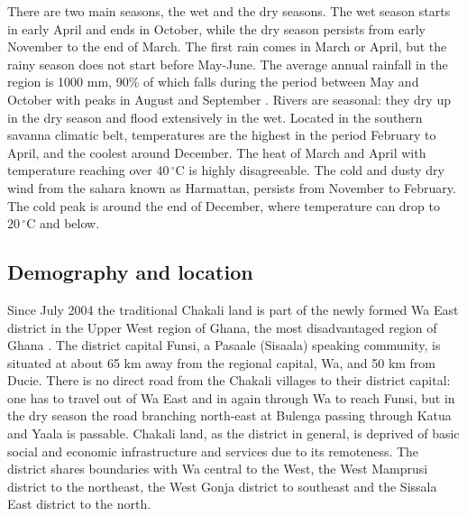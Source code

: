  There are two main seasons, the wet and the dry seasons. The wet season starts
in early April and ends in October, while the dry season persists from early
November to the end  of March. The first rain comes in March or April,
but the rainy season does not start before May-June.  The average annual
rainfall in the region is 1000 mm,  90\% of which falls during the period
between May and October with peaks in August and September \citep[2-3]{Blen05}.
Rivers
are seasonal: they dry up in the dry season and  flood extensively in the wet.
 Located in the  southern savanna climatic belt,   temperatures are the highest in the period February to April, and the
coolest around December. The heat of  March and April with temperature reaching
over $40\,^{\circ}\mathrm{C}$ is highly disagreeable.   The cold and dusty dry
wind from the sahara known as Harmattan,  persists from November to February.
The cold peak is  around the end of December, where temperature can drop to 
$20\,^{\circ}\mathrm{C}$ and below. 



\subsection{Demography and location}
\label{sec:SOC-dem}
Since July 2004 the traditional Chakali land is part of the newly formed Wa East
district in the Upper West region of Ghana, the most disadvantaged region of
Ghana \citep[18]{Blen05}. The district capital Funsi, a Pasaale (Sisaala) 
speaking community, is situated at about 65 km away from the regional capital, Wa, 
and 50 km from Ducie. There is no direct road from
 the Chakali villages to their district capital: one has to travel out of Wa
East and
in again through Wa to reach Funsi,  but in the dry season the road branching
north-east at Bulenga passing through Katua and Yaala is passable. Chakali
land,
as  the district in general, is deprived of basic social and
economic infrastructure and services due to its remoteness. The district shares
boundaries with Wa
central to the West, the West Mamprusi district to the northeast, the West Gonja
district to southeast and the Sissala East district to the north. 



